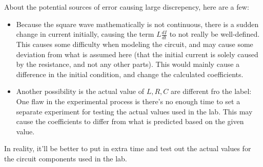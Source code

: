 \documentclass{article}
\begin{document}
\hfil

About the potential sources of error causing large discrepency, here are a few:
\begin{itemize}
    \item Because the square wave mathematically is not continuous, there is a sudden change in current initially, causing the term $L\frac{dI}{dt}$ to not really be well-defined. This causes some difficulty when modeling the circuit, and may cause some deviation from what is assumed here (that the initial current is solely caused by the resistance, and not any other parts). This would mainly cause a difference in the initial condition, and change the calculated coefficients.
    \item Another possibility is the actual value of $L,R,C$ are different fro the label: One flaw in the experimental process is there's no enough time to set a separate experiment for testing the actual values used in the lab. This may cause the coefficients to differ from what is predicted based on the given value.
\end{itemize}
In reality, it'll be better to put in extra time and test out the actual values for the circuit components used in the lab.
\end{document}
